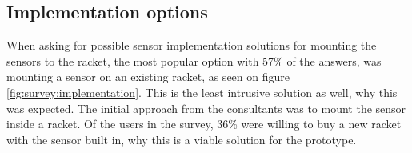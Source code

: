 
\subsection*{Implementation options}
When asking for possible sensor implementation solutions for mounting the sensors to the racket, the most popular option with 57\% of the answers, was mounting a sensor on an existing racket, as seen on figure \ref{fig:survey:implementation}. 
This is the least intrusive solution as well, why this was expected.
The initial approach from the consultants was to mount the sensor inside a racket.
Of the users in the survey, 36\% were willing to buy a new racket with the sensor built in, why this is a viable solution for the prototype.

